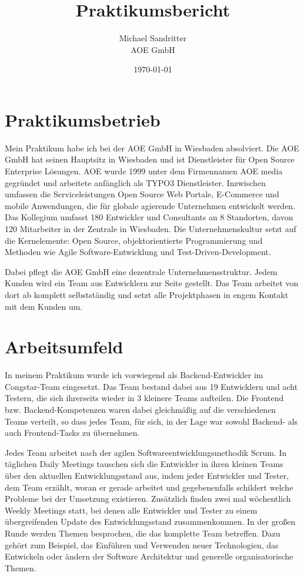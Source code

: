 \documentclass[11pt,a4paper]{article} %
\title{Praktikumsbericht}
\author{Michael Sandritter \\ AOE GmbH}
\date{\today}
\begin{document}
\maketitle %


\newpage %

\section{Praktikumsbetrieb} \label{sec:betrieb} 

Mein Praktikum habe ich bei der AOE GmbH in Wiesbaden absolviert. 
Die AOE GmbH hat seinen Hauptsitz in Wiesbaden und ist Dienstleister für Open
Source Enterprise Lösungen.
AOE wurde 1999 unter dem Firmennamen AOE media gegründet und arbeitete
anfänglich als TYPO3 Dienstleister.
Inzwischen umfassen die Serviceleistungen Open Source Web Portale, E-Commerce und mobile Anwendungen, 
die für globale agierende Unternehmen entwickelt werden. 
Das Kollegium umfasst 180 Entwickler und Consultants an 8 Standorten, davon 120 Mitarbeiter in der Zentrale in Wiesbaden. 
Die Unternehmenskultur setzt auf die Kernelemente: Open Source, objektorientierte Programmierung und Methoden 
wie Agile Software-Entwicklung und Test-Driven-Development. 

Dabei pflegt die AOE GmbH eine dezentrale Unternehmensstruktur. Jedem Kunden wird ein Team aus Entwicklern zur Seite gestellt. 
Das Team arbeitet von dort ab komplett selbstständig und setzt alle
Projektphasen in engem Kontakt mit dem Kunden um.

\section{Arbeitsumfeld} \label{sec:umfeld}

In meinem Praktikum wurde ich vorwiegend als Backend-Entwickler im Congstar-Team eingesetzt. 
Das Team bestand dabei aus 19 Entwicklern und acht Testern, die sich ihrerseits wieder in 3 kleinere Teams aufteilen.  
Die Frontend bzw. Backend-Kompetenzen waren dabei gleichmäßig auf die 
verschiedenen Teams verteilt, so dass jedes Team, für sich, in der Lage war sowohl Backend- als auch
 Frontend-Tasks zu übernehmen.

Jedes Team arbeitet nach der agilen Softwareentwicklungsmethodik Scrum. 
In täglichen Daily Meetings tauschen sich die Entwickler in ihren kleinen Teams
über den aktuellen Entwicklungsstand aus, indem jeder Entwickler und Tester, dem
Team erzählt, woran er gerade arbeitet und gegebenenfalls schildert welche
Probleme bei der Umsetzung existieren.
Zusätzlich finden zwei mal wöchentlich Weekly Meetings statt, 
bei denen alle Entwickler und Tester zu einem übergreifenden Update des
Entwicklungsstand zusammenkommen.
In der großen Runde werden Themen besprochen, die das komplette Team betreffen. 
Dazu gehört zum Beispiel, das Einführen und Verwenden neuer Technologien, das
Entwickeln oder ändern der Software Architektur und generelle organisatorische
Themen.
\end{document}
